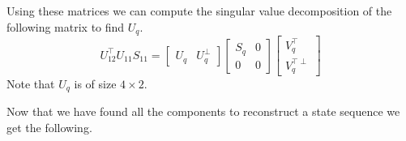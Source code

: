 Using these matrices we can compute the singular value decomposition of the following matrix to find $U_q$.
\begin{equation*}
U^\top_{12} U_{11} S_{11} = \begin{bmatrix} U_q & U_q^\perp \end{bmatrix} \begin{bmatrix} S_q & 0 \\ 0 & 0 \end{bmatrix} \begin{bmatrix}V^\top_q \\ V_q ^{\top \perp} \end{bmatrix}
\end{equation*}
Note that $U_q$ is of size $4 \times 2$.

Now that we have found all the components to reconstruct a state sequence we get the following.

